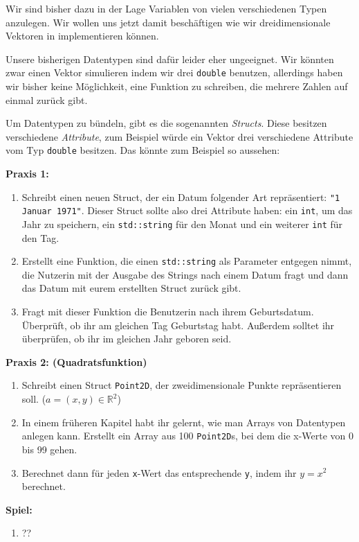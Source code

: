 
Wir sind bisher dazu in der Lage Variablen von vielen verschiedenen Typen anzulegen.
Wir wollen uns jetzt damit beschäftigen wie wir dreidimensionale Vektoren in \Cpp implementieren können.

Unsere bisherigen Datentypen sind dafür leider eher ungeeignet.
Wir könnten zwar einen Vektor simulieren indem wir drei \texttt{double} benutzen, allerdings haben wir bisher keine Möglichkeit, eine Funktion zu schreiben, die mehrere Zahlen auf einmal zurück gibt.

Um Datentypen zu bündeln, gibt es die sogenannten \emph{Structs}.
Diese besitzen verschiedene \emph{Attribute}, zum Beispiel würde ein Vektor drei verschiedene Attribute vom Typ \texttt{double} besitzen.
Das könnte zum Beispiel so aussehen:


%

\textbf{Praxis 1:}
\begin{enumerate}
    \item Schreibt einen neuen Struct, der ein Datum folgender Art repräsentiert: \texttt{"1 Januar 1971"}.
        Dieser Struct sollte also drei Attribute haben:
        ein \texttt{int}, um das Jahr zu speichern,
        ein \texttt{std::string} für den Monat
        und ein weiterer \texttt{int} für den Tag.

    \item Erstellt eine Funktion, die einen \texttt{std::string} als Parameter entgegen nimmt, die Nutzerin mit der Ausgabe des Strings nach einem Datum fragt und dann das Datum mit eurem erstellten Struct zurück gibt.

    \item Fragt mit dieser Funktion die Benutzerin nach ihrem Geburtsdatum. Überprüft, ob ihr am gleichen Tag Geburtstag habt.
Außerdem solltet ihr überprüfen, ob ihr im gleichen Jahr geboren seid.
\end{enumerate}

\textbf{Praxis 2: (Quadratsfunktion)}
\begin{enumerate}
    \item Schreibt einen Struct \texttt{Point2D}, der zweidimensionale Punkte
        repräsentieren soll. ($a = (x, y) \in \mathbb{R}^2$)
    \item In einem früheren Kapitel habt ihr gelernt, wie man Arrays von
        Datentypen anlegen kann. Erstellt ein Array aus 100 \texttt{Point2D}s, bei dem die
        x-Werte von 0 bis 99 gehen.
    \item Berechnet dann für jeden \texttt{x}-Wert das entsprechende \texttt{y},
        indem ihr $y = x^2$ berechnet.
\end{enumerate}

\textbf{Spiel:}
\begin{enumerate}
    \item ??
\end{enumerate}
